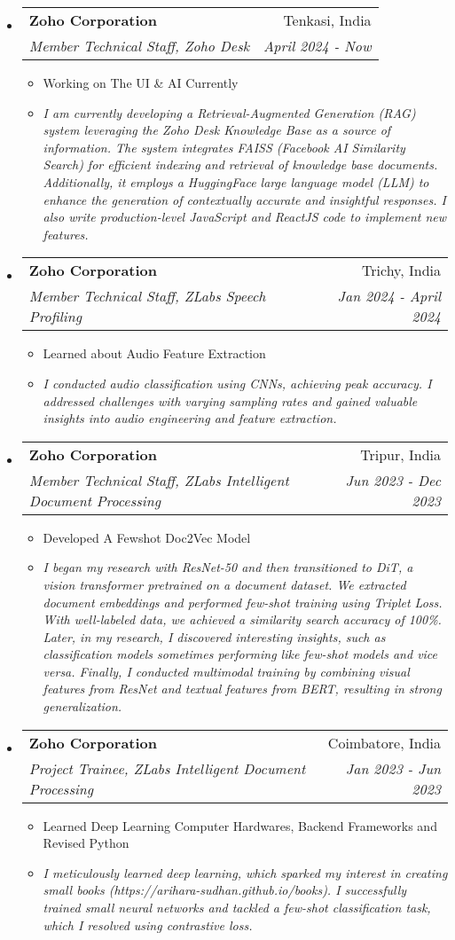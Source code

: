 \documentclass[letterpaper,11pt]{article}
\makeatletter
\newcommand{\resitem}[1]{\item #1 \vspace{-2pt}}
\newcommand{\resheading}[1]{\textbf{\sffamily{\mbox{~}{\large #1} \vphantom{p\^{E}}}}}
\newcommand{\ressubheading}[4]{
\begin{tabular*}{6.5in}{l@{\extracolsep{\fill}}r}
		\textbf{#1} & #2 \\
		\textit{#3} & \textit{#4} \\
\end{tabular*}\vspace{-6pt}}
\makeatother
\begin{document}
\vspace{0.05in}
\resheading{Work Experience}
\begin{itemize}
\item[]
	\ressubheading{Zoho Corporation}{Tenkasi, India}{Member Technical Staff, Zoho Desk}{April 2024 - Now}
	\begin{itemize}
		\resitem{Working on The UI & AI Currently}
		\resitem{\textit{I am currently developing a Retrieval-Augmented Generation (RAG) system leveraging the Zoho Desk Knowledge Base as a source of information. The system integrates FAISS (Facebook AI Similarity Search) for efficient indexing and retrieval of knowledge base documents. Additionally, it employs a HuggingFace large language model (LLM) to enhance the generation of contextually accurate and insightful responses. I also write production-level JavaScript and ReactJS code to implement new features.}}
	\end{itemize}

\item[]
	\ressubheading{Zoho Corporation}{Trichy, India}{Member Technical Staff, ZLabs Speech Profiling}{Jan 2024 - April 2024}
	\begin{itemize}
		\resitem{Learned about Audio Feature Extraction}
		\resitem{\textit{I conducted audio classification using CNNs, achieving peak accuracy. I addressed challenges with varying sampling rates and gained valuable insights into audio engineering and feature extraction.}}
	\end{itemize}
	
\item[]
	\ressubheading{Zoho Corporation}{Tripur, India}{Member Technical Staff, ZLabs Intelligent Document Processing}{Jun 2023 - Dec 2023}
	\begin{itemize}
		\resitem{Developed A Fewshot Doc2Vec Model}
		\resitem{\textit{I began my research with ResNet-50 and then transitioned to DiT, a vision transformer pretrained on a document dataset. We extracted document embeddings and performed few-shot training using Triplet Loss. With well-labeled data, we achieved a similarity search accuracy of 100\%. Later, in my research, I discovered interesting insights, such as classification models sometimes performing like few-shot models and vice versa. Finally, I conducted multimodal training by combining visual features from ResNet and textual features from BERT, resulting in strong generalization.}}
	\end{itemize}

\item[]
	\ressubheading{Zoho Corporation}{Coimbatore, India}{Project Trainee, ZLabs Intelligent Document Processing}{Jan 2023 - Jun 2023}
	\begin{itemize}
		\resitem{Learned Deep Learning Computer Hardwares, Backend Frameworks and Revised Python}
		\resitem{\textit{I meticulously learned deep learning, which sparked my interest in creating small books (https://arihara-sudhan.github.io/books). I successfully trained small neural networks and tackled a few-shot classification task, which I resolved using contrastive loss.}}
	\end{itemize}

\end{itemize}
\end{document}
